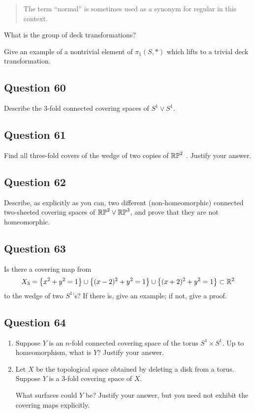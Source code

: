 \documentclass[12pt]{article}
\begin{document}
\begin{quote}
The term ``normal'' is sometimes used as a synonym for regular in this
context.
\end{quote}

What is the group of deck transformations?

Give an example of a nontrivial element of \(\pi_1 (S, \ast)\) which
lifts to a trivial deck transformation.

\hypertarget{question-60-3}{%
\subsection{Question 60}\label{question-60-3}}

Describe the 3-fold connected covering spaces of \(S^1 \lor S^1\).

\hypertarget{question-61-3}{%
\subsection{Question 61}\label{question-61-3}}

Find all three-fold covers of the wedge of two copies of \({\mathbb{RP}}^2\) .
Justify your answer.

\hypertarget{question-62-3}{%
\subsection{Question 62}\label{question-62-3}}

Describe, as explicitly as you can, two different (non-homeomorphic)
connected two-sheeted covering spaces of \({\mathbb{RP}}^2 \lor {\mathbb{RP}}^3\), and prove
that they are not homeomorphic.

\hypertarget{question-63-3}{%
\subsection{Question 63}\label{question-63-3}}

Is there a covering map from \[
X_3 = \left\{{x^2 + y^2 = 1}\right\} \cup \left\{{(x - 2)^2 + y^2 = 1}\right\} \cup \left\{{(x + 2)^2 + y^2 = 1}\right\} \subset {\mathbb{R}}^2
\] to the wedge of two \(S^1\)'s? If there is, give an example; if not,
give a proof.

\hypertarget{question-64-3}{%
\subsection{Question 64}\label{question-64-3}}

\begin{enumerate}
\def\labelenumi{\alph{enumi}.}
\item
  Suppose \(Y\) is an \(n\)-fold connected covering space of the torus
  \(S^1 \times S^1\). Up to homeomorphism, what is \(Y\)? Justify your
  answer.
\item
  Let \(X\) be the topological space obtained by deleting a disk from a
  torus. Suppose \(Y\) is a 3-fold covering space of \(X\).

  What surfaces could \(Y\) be? Justify your answer, but you need not
  exhibit the covering maps explicitly.
\end{enumerate}
\end{document}
